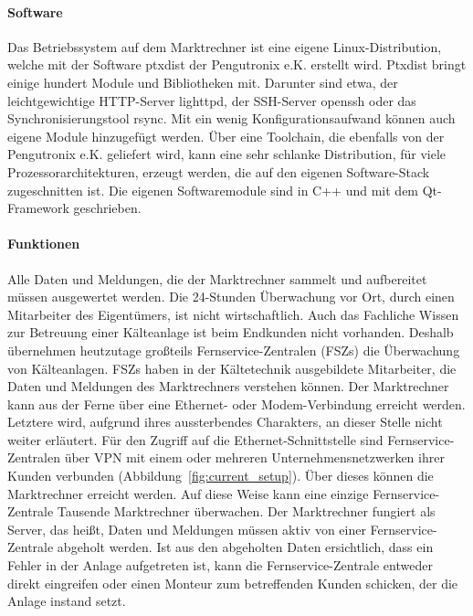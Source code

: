 \documentclass[11pt,a4paper]{report}
\begin{document}
\paragraph{Software}

Das Betriebssystem auf dem Marktrechner ist eine eigene Linux-Distribu\-tion, welche mit der Software ptxdist der Pengutronix e.K. erstellt wird. Ptxdist bringt einige hundert Module und Bibliotheken mit. Darunter sind etwa, der leichtgewichtige HTTP-Server lighttpd, der SSH-Server openssh oder das Synchronisierungstool rsync. Mit ein wenig Konfigurationsaufwand können auch eigene Module hinzugefügt werden. Über eine Toolchain, die ebenfalls von der Pengutronix e.K. geliefert wird, kann eine sehr schlanke Distribution, für viele Prozessorarchitekturen,  erzeugt werden, die auf den eigenen Software-Stack zugeschnitten ist. Die eigenen Softwaremodule sind in C++ und mit dem Qt-Framework geschrieben. 

\paragraph{Funktionen} \label{para:architektur}

Alle Daten und Meldungen, die der Marktrechner sammelt und aufbereitet müssen ausgewertet werden. Die 24-Stunden Überwachung vor Ort, durch einen Mitarbeiter des Eigentümers, ist nicht wirtschaftlich. Auch das Fachliche Wissen zur Betreuung einer Kälteanlage ist beim Endkunden nicht vorhanden. Deshalb übernehmen heutzutage großteils Fernservice-Zentralen (FSZs) die Überwachung von Kälteanlagen. FSZs haben in der Kältetechnik ausgebildete Mitarbeiter, die Daten und Meldungen des Marktrechners verstehen können. Der Marktrechner kann aus der Ferne über eine Ethernet- oder Modem-Verbindung erreicht werden. Letztere wird, aufgrund ihres aussterbendes Charakters, an dieser Stelle nicht weiter erläutert. Für den Zugriff auf die Ethernet-Schnittstelle sind Fernservice-Zentralen über VPN mit einem oder mehreren Unternehmensnetzwerken ihrer Kunden verbunden (Abbildung~\ref{fig:current_setup}). Über dieses können die Marktrechner erreicht werden. Auf diese Weise kann eine einzige Fernservice-Zentrale Tausende Marktrechner überwachen. Der Marktrechner fungiert als Server, das heißt, Daten und Meldungen müssen aktiv von einer Fernservice-Zentrale abgeholt werden. Ist aus den abgeholten Daten ersichtlich, dass ein Fehler in der Anlage aufgetreten ist, kann die Fernservice-Zentrale entweder direkt eingreifen oder einen Monteur zum betreffenden Kunden schicken, der die Anlage instand setzt.
\end{document}
